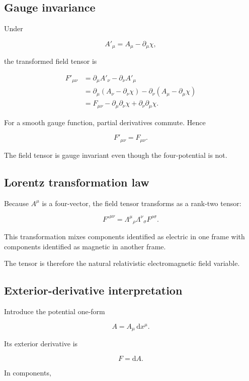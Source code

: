 \subsection{Gauge invariance}

Under

\[
A'_{\mu}
=
A_{\mu}
-
\partial_{\mu}\chi,
\]

the transformed field tensor is

\[
\begin{aligned}
F'_{\mu\nu}
&=
\partial_{\mu}A'_{\nu}
-
\partial_{\nu}A'_{\mu}\\
&=
\partial_{\mu}
\left(
A_{\nu}-\partial_{\nu}\chi
\right)
-
\partial_{\nu}
\left(
A_{\mu}-\partial_{\mu}\chi
\right)\\
&=
F_{\mu\nu}
-
\partial_{\mu}\partial_{\nu}\chi
+
\partial_{\nu}\partial_{\mu}\chi.
\end{aligned}
\]

For a smooth gauge function, partial derivatives commute. Hence

\[
\boxed{
F'_{\mu\nu}=F_{\mu\nu}
}.
\]

The field tensor is gauge invariant even though the four-potential is not.

\subsection{Lorentz transformation law}

Because \(A^{\mu}\) is a four-vector, the field tensor transforms as a rank-two tensor:

\[
\boxed{
F'^{\mu\nu}
=
\Lambda^{\mu}{}_{\rho}
\Lambda^{\nu}{}_{\sigma}
F^{\rho\sigma}
}.
\]

This transformation mixes components identified as electric in one frame with components identified as magnetic in another frame.

The tensor is therefore the natural relativistic electromagnetic field variable.

\subsection{Exterior-derivative interpretation}

Introduce the potential one-form

\[
A
=
A_{\mu}\,\mathrm{d}x^{\mu}.
\]

Its exterior derivative is

\[
F
=
\mathrm{d}A.
\]

In components,

